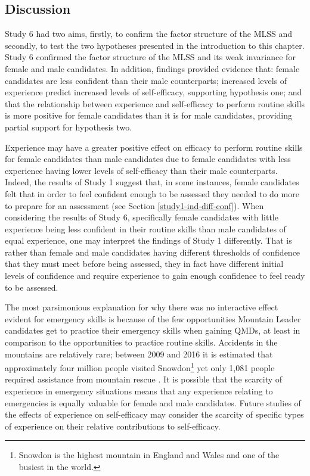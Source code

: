 \documentclass[
  12pt,
  a4paper,
]{book}
\begin{document}
\hypertarget{study-6-discussion}{%
\subsection{Discussion}\label{study-6-discussion}}

Study 6 had two aims, firstly, to confirm the factor structure of the MLSS and secondly, to test the two hypotheses presented in the introduction to this chapter. Study 6 confirmed the factor structure of the MLSS and its weak invariance for female and male candidates. In addition, findings provided evidence that: female candidates are less confident than their male counterparts; increased levels of experience predict increased levels of self-efficacy, supporting hypothesis one; and that the relationship between experience and self-efficacy to perform routine skills is more positive for female candidates than it is for male candidates, providing partial support for hypothesis two.

Experience may have a greater positive effect on efficacy to perform routine skills for female candidates than male candidates due to female candidates with less experience having lower levels of self-efficacy than their male counterparts. Indeed, the results of Study 1 suggest that, in some instances, female candidates felt that in order to feel confident enough to be assessed they needed to do more to prepare for an assessment (see Section \ref{study1-ind-diff-conf}). When considering the results of Study 6, specifically female candidates with little experience being less confident in their routine skills than male candidates of equal experience, one may interpret the findings of Study 1 differently. That is rather than female and male candidates having different thresholds of confidence that they must meet before being assessed, they in fact have different initial levels of confidence and require experience to gain enough confidence to feel ready to be assessed.

The most parsimonious explanation for why there was no interactive effect evident for emergency skills is because of the few opportunities Mountain Leader candidates get to practice their emergency skills when gaining QMDs, at least in comparison to the opportunities to practice routine skills. Accidents in the mountains are relatively rare; between 2009 and 2016 it is estimated that approximately four million people visited Snowdon\footnote{Snowdon is the highest mountain in England and Wales and one of the busiest in the world.} yet only 1,081 people required assistance from mountain rescue \citep[i.e., \textless{} 0.01\% of visitors;][]{SNPA2017}. It is possible that the scarcity of experience in emergency situations means that any experience relating to emergencies is equally valuable for female and male candidates. Future studies of the effects of experience on self-efficacy may consider the scarcity of specific types of experience on their relative contributions to self-efficacy.
\end{document}
